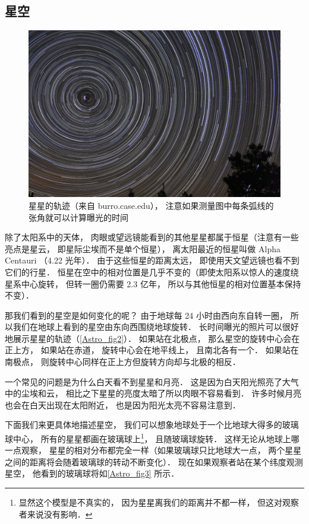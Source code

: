 \subsection{星空}

\begin{figure}[ht]
\centering
\includegraphics[width=14cm]{./figures/Astro2.pdf}
\caption{星星的轨迹（来自 burro.case.edu）， 注意如果测量图中每条弧线的张角就可以计算曝光的时间} \label{Astro_fig2}
\end{figure}

除了太阳系中的天体， 肉眼或望远镜能看到的其他星星都属于恒星（注意有一些亮点是星云， 即星际尘埃而不是单个恒星）， 离太阳最近的恒星叫做 Alpha Centauri （4.22 光年）． 由于这些恒星的距离太远， 即使用天文望远镜也看不到它们的行星． 恒星在空中的相对位置是几乎不变的（即使太阳系以惊人的速度绕星系中心旋转， 但转一圈仍需要 2.3 亿年， 所以与其他恒星的相对位置基本保持不变）．

那我们看到的星空是如何变化的呢？ 由于地球每 24 小时由西向东自转一圈， 所以我们在地球上看到的星空由东向西围绕地球旋转． 长时间曝光的照片可以很好地展示星星的轨迹（\autoref{Astro_fig2}）． 如果站在北极点， 那么星空的旋转中心会在正上方， 如果站在赤道， 旋转中心会在地平线上， 且南北各有一个． 如果站在南极点， 则旋转中心同样在正上方但旋转方向却与北极的相反．

一个常见的问题是为什么白天看不到星星和月亮． 这是因为白天阳光照亮了大气中的尘埃和云， 相比之下星星的亮度太暗了所以肉眼不容易看到． 许多时候月亮也会在白天出现在太阳附近， 也是因为阳光太亮不容易注意到．

下面我们来更具体地描述星空， 我们可以想象地球处于一个比地球大得多的玻璃球中心， 所有的星星都画在玻璃球上\footnote{显然这个模型是不真实的， 因为星星离我们的距离并不都一样， 但这对观察者来说没有影响．}， 且随玻璃球旋转． 这样无论从地球上哪一点观察， 星星的相对分布都完全一样（如果玻璃球只比地球大一点， 两个星星之间的距离将会随着玻璃球的转动不断变化）． 现在如果观察者站在某个纬度观测星空， 他看到的玻璃球将如\autoref{Astro_fig3} 所示．

